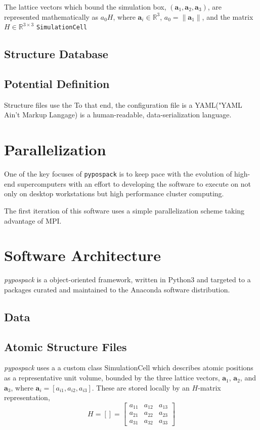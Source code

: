 The lattice vectors which bound the simulation box, $(\bm{a}_1,\bm{a}_2,\bm{a}_3)$,  are represented mathematically as $a_0 H$, where $\bm{a}_i \in \mathbb{R}^3$, $a_0 = \lVert\bm{a}_1\rVert$, and the matrix $H \in \mathbb{R}^{3\times3}$
\verb|SimulationCell|

\subsection{Structure Database}
\subsection{Potential Definition}

Structure files use the
To that end, the configuration file is a YAML("YAML Ain't Markup Langage) is a human-readable, data-serialization language.


\section{Parallelization}
One of the key focuses of \verb|pypospack| is to keep pace with the evolution of high-end supercomputers with an effort to developing the software to execute on not only on desktop workstations but high performance cluster computing.

The first iteration of this software uses a simple parallelization scheme taking advantage of MPI.
\section{Software Architecture}

\emph{pypospack} is a object-oriented framework, written in Python3 and targeted to a packages curated and maintained to the Anaconda software distribution.

\subsection{Data}
\subsection{Atomic Structure Files}

\emph{pypospack} uses a a custom class SimulationCell which describes atomic positions as a representative unit volume, bounded by the three lattice vectors, $\bm{a}_1$, $\bm{a}_2$, and $\bm{a}_3$, where $\bm{a}_i=[a_{i1},a_{i2},a_{i3}]$.  These are stored locally by an $H$-matrix representation,
\begin{equation}\label{eq:H-matrix}
     H=\left[\right] =
      \begin{bmatrix}
        a_{11}&a_{12}&a_{13}\\
        a_{21}&a_{22}&a_{23}\\
        a_{31}&a_{32}&a_{33}
      \end{bmatrix}
\end{equation}

